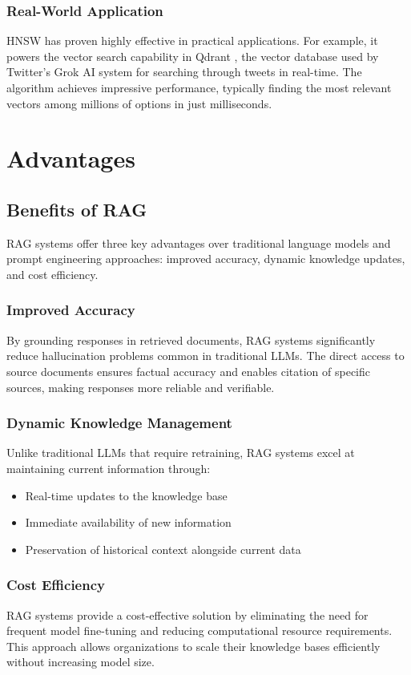 \documentclass[12pt]{article}
\begin{document}
    \subsubsection*{Real-World Application}
    
    HNSW has proven highly effective in practical applications. For example, it powers the vector search 
    capability in Qdrant \cite{qdrant}, the vector database used by Twitter's Grok AI system for searching 
    through tweets in real-time. The algorithm achieves impressive performance, typically finding the most relevant 
    vectors among millions of options in just milliseconds.


    \section{Advantages}
    \subsection{Benefits of RAG}
    RAG systems offer three key advantages over traditional language models and prompt engineering approaches: 
    improved accuracy, dynamic knowledge updates, and cost efficiency.
    \subsubsection*{Improved Accuracy}
    By grounding responses in retrieved documents, RAG systems significantly reduce hallucination problems common 
    in traditional LLMs. The direct access to source documents ensures factual accuracy and enables citation of 
    specific sources, making responses more reliable and verifiable.
    \subsubsection*{Dynamic Knowledge Management}
    Unlike traditional LLMs that require retraining, RAG systems excel at maintaining current information through:
    \begin{itemize}
    \item Real-time updates to the knowledge base
    \item Immediate availability of new information
    \item Preservation of historical context alongside current data
    \end{itemize}
    \subsubsection*{Cost Efficiency}
    RAG systems provide a cost-effective solution by eliminating the need for frequent model fine-tuning and reducing 
    computational resource requirements. This approach allows organizations to scale their knowledge bases efficiently 
    without increasing model size.
\end{document}
